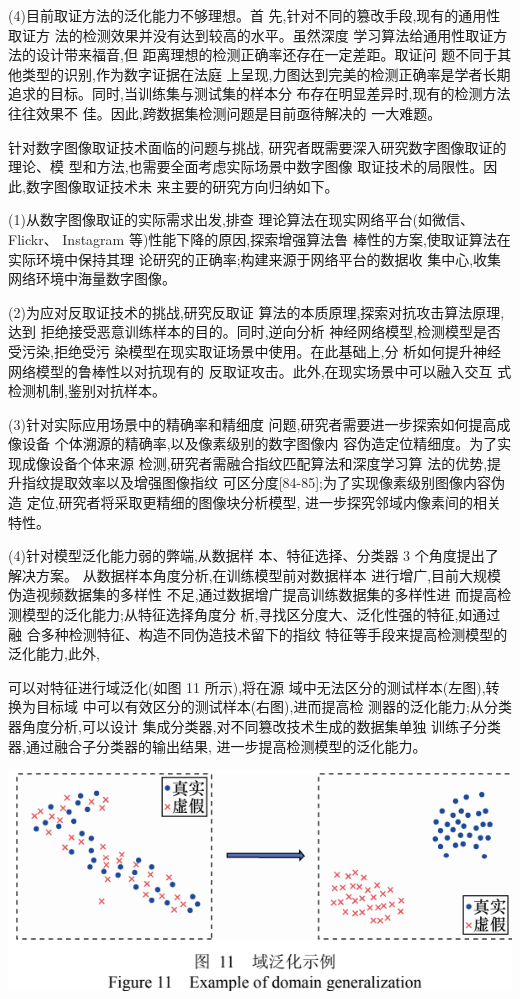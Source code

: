 \documentclass{article}
\begin{document}
(4)目前取证方法的泛化能力不够理想。首 先,针对不同的篡改手段,现有的通用性取证方 法的检测效果并没有达到较高的水平。虽然深度 学习算法给通用性取证方法的设计带来福音,但 距离理想的检测正确率还存在一定差距。取证问 题不同于其他类型的识别,作为数字证据在法庭 上呈现,力图达到完美的检测正确率是学者长期 追求的目标。同时,当训练集与测试集的样本分 布存在明显差异时,现有的检测方法往往效果不 佳。因此,跨数据集检测问题是目前亟待解决的 一大难题。

针对数字图像取证技术面临的问题与挑战, 研究者既需要深入研究数字图像取证的理论、模 型和方法,也需要全面考虑实际场景中数字图像 取证技术的局限性。因此,数字图像取证技术未 来主要的研究方向归纳如下。

(1)从数字图像取证的实际需求出发,排查 理论算法在现实网络平台(如微信、Flickr、 Instagram 等)性能下降的原因,探索增强算法鲁 棒性的方案,使取证算法在实际环境中保持其理 论研究的正确率;构建来源于网络平台的数据收 集中心,收集网络环境中海量数字图像。

(2)为应对反取证技术的挑战,研究反取证 算法的本质原理,探索对抗攻击算法原理,达到 拒绝接受恶意训练样本的目的。同时,逆向分析 神经网络模型,检测模型是否受污染,拒绝受污 染模型在现实取证场景中使用。在此基础上,分 析如何提升神经网络模型的鲁棒性以对抗现有的 反取证攻击。此外,在现实场景中可以融入交互 式检测机制,鉴别对抗样本。

(3)针对实际应用场景中的精确率和精细度 问题,研究者需要进一步探索如何提高成像设备 个体溯源的精确率,以及像素级别的数字图像内 容伪造定位精细度。为了实现成像设备个体来源 检测,研究者需融合指纹匹配算法和深度学习算 法的优势,提升指纹提取效率以及增强图像指纹 可区分度[84-85];为了实现像素级别图像内容伪造 定位,研究者将采取更精细的图像块分析模型, 进一步探究邻域内像素间的相关特性。

(4)针对模型泛化能力弱的弊端,从数据样 本、特征选择、分类器 3 个角度提出了解决方案。 从数据样本角度分析,在训练模型前对数据样本 进行增广,目前大规模伪造视频数据集的多样性 不足,通过数据增广提高训练数据集的多样性进 而提高检测模型的泛化能力;从特征选择角度分 析,寻找区分度大、泛化性强的特征,如通过融 合多种检测特征、构造不同伪造技术留下的指纹 特征等手段来提高检测模型的泛化能力,此外,

可以对特征进行域泛化(如图 11 所示),将在源 域中无法区分的测试样本(左图),转换为目标域 中可以有效区分的测试样本(右图),进而提高检 测器的泛化能力;从分类器角度分析,可以设计 集成分类器,对不同篡改技术生成的数据集单独 训练子分类器,通过融合子分类器的输出结果, 进一步提高检测模型的泛化能力。


\includegraphics{_page_12_Figure_10.png}
\end{document}
